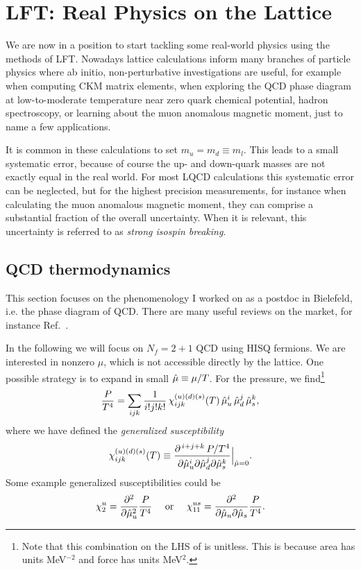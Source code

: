 \chapter{LFT: Real Physics on the Lattice}\label{ch:realPhys}

We are now in a position to start tackling some real-world physics using the
methods of LFT. Nowadays lattice calculations inform many branches of particle
physics where ab initio, non-perturbative investigations are useful, for example
when computing CKM matrix elements, when exploring the QCD phase diagram at
low-to-moderate temperature near zero quark chemical potential, hadron
spectroscopy, or learning about the muon anomalous magnetic moment, just to name
a few applications.

It is common in these calculations to set $m_u=m_d\equiv m_l$.
This leads to a small systematic error, because of course the up-
and down-quark masses are not exactly equal in the real world. For most
LQCD calculations this systematic error can be neglected, but for the
highest precision measurements, for instance when calculating
the muon anomalous magnetic moment, they can comprise a substantial fraction of
the overall uncertainty. When it is relevant, this uncertainty
is referred to as {\it strong isospin breaking}.

\section{QCD thermodynamics}\label{sec:QCDtherm} 

This section focuses on the phenomenology I worked on as a postdoc in
Bielefeld, i.e. the phase diagram of QCD. There are many useful reviews
on the market, for instance Ref.~\cite{ding_thermodynamics_2015}.

In the following we will focus on $N_f=2+1$ QCD using HISQ fermions. We are
interested in nonzero $\mu$, which is not accessible directly by the lattice.
One possible strategy is to expand in small $\hat{\mu}\equiv\mu/T$. For the
pressure, we find\footnote{Note that this combination on the LHS of 
 is unitless. This is because area has units
MeV$^{-2}$ and force has units MeV$^2$.}
\begin{equation}\label{eq:pxpac}
\frac{P}{T^4}=\sum_{ijk}\frac{1}{i!j!k!}\,\chi_{ijk}^{(u)(d)(s)}(T)\,
               \hat{\mu}_u^i\,\hat{\mu}_d^j\,\hat{\mu}_s^k,
\end{equation}
where we have defined the {\it generalized
susceptibility}
\begin{equation}
\chi_{ijk}^{(u)(d)(s)}(T)
  \equiv\frac{\partial^{\,i+j+k}\,P/T^4}{\partial\hat{\mu}_u^i\partial\hat{\mu}_d^j
                                       \partial\hat{\mu}_s^k}\Big|_{\hat{\mu}=0}.
\end{equation}
Some example generalized susceptibilities could be
\begin{equation}
  \chi_2^u=\frac{\partial^2}{\partial\hat{\mu}_u^2}\frac{P}{T^4}
  ~~~~\text{or}~~~~
  \chi_{11}^{us}=\frac{\partial^2}{\partial\hat{\mu}_u\partial\hat{\mu}_s}\frac{P}{T^4}.
\end{equation}

